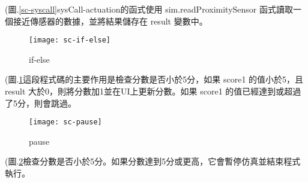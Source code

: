 (圖.\ref{sc-syscall}sysCall-actuation的函式使用 sim.readProximitySensor 函式讀取一個接近傳感器的數據，並將結果儲存在 result 變數中。\\
\newpage
\begin{figure}[hbt!]
\begin{center}
\texttt{[image: sc-if-else]}
\caption{\Large if-else}\label{sc-if-else}
\end{center}
\end{figure}

(圖.\ref{sc-if-else}這段程式碼的主要作用是檢查分數是否小於5分，如果 score1 的值小於5，且 result 大於0，則將分數加1並在UI上更新分數。如果 score1 的值已經達到或超過了5分，則會跳過。\\
\begin{figure}[hbt!]
\begin{center}
\texttt{[image: sc-pause]}
\caption{\Large pause}\label{sc-pause}
\end{center}
\end{figure}

(圖.\ref{sc-pause}檢查分數是否小於5分。如果分數達到5分或更高，它會暫停仿真並結束程式執行。\\













